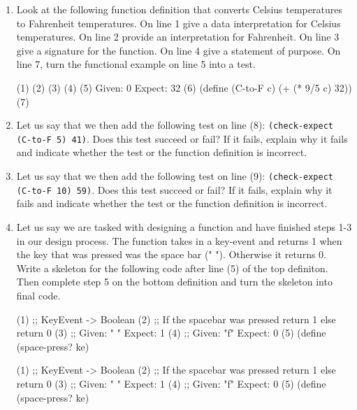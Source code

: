 \documentclass[11pt]{article}
\newcommand{\prog}[1]{\texttt{#1}}
\begin{document}
  \begin{enumerate}

  \item Look at the following function definition that converts
    Celsius temperatures to Fahrenheit temperatures. On line 1
    give a data interpretation for Celsius temperatures. On line 2
    provide an interpretation for Fahrenheit. On line 3 give a signature
    for the function. On line 4 give a statement of purpose. On line 7,
    turn the functional example on line 5 into a test.
    \begin{program}
      (1)
      (2)
      (3)
      (4)
      (5) Given: 0 Expect: 32
      (6) (define (C-to-F c) (+ (* 9/5 c) 32))
      (7)
    \end{program}

  \item Let us say that we then add the following test on line (8):
    \prog{(check-expect (C-to-F 5) 41)}. Does this test succeed or fail?
     If it fails, explain why it fails and indicate whether the test or the function definition is incorrect.

  \item Let us say that we then add the following test on line (9):
    \prog{(check-expect (C-to-F 10) 59)}. Does this test succeed or fail?
    If it fails, explain why it fails and indicate whether the test  or 
    the function definition is incorrect.

  \item Let us say we are tasked with designing a function and have finished
    steps 1-3 in our design process. The function takes in a key-event and
    returns 1 when the key that was pressed was the space bar (" "). Otherwise
    it returns 0. Write a skeleton for the following code after line (5)
    of the top definiton. Then complete step 5 on the bottom definition and
    turn the skeleton into final code.

    \begin{program}
      (1) ;; KeyEvent -> Boolean
      (2) ;; If the spacebar was pressed return 1 else return 0
      (3) ;; Given: " " Expect: 1
      (4) ;; Given: "f" Expect: 0
      (5) (define (space-press? ke)





      
    \end{program}

    \begin{program}
      (1) ;; KeyEvent -> Boolean
      (2) ;; If the spacebar was pressed return 1 else return 0
      (3) ;; Given: " " Expect: 1
      (4) ;; Given: "f" Expect: 0
      (5) (define (space-press? ke)





      
    \end{program}

  \end{enumerate}
\end{document}
